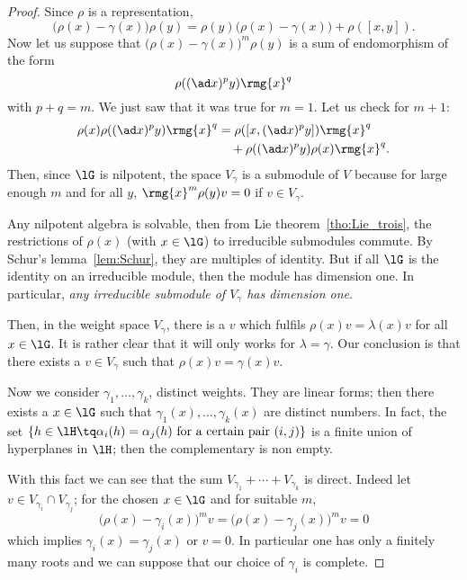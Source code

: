 \begin{proof}
Since $\rho$ is a representation,
\[
\big(\rho(x)-\gamma(x)\big)\rho(y)=\rho(y)\big( \rho(x)-\gamma(x) \big)+\rho([x,y]).
\]
Now let us suppose that $\big(\rho(x)-\gamma(x)\big)^m\rho(y)$ is a sum of endomorphism of the form
\[
\rho( (\ad x)^py )\rmg{x}^q
\]
with $p+q=m$. We just saw that it was true for $m=1$. Let us check for $m+1$:
\begin{equation}
\begin{split}
\rho(x)\rho( (\ad x)^py )\rmg{x}^q&=\rho( [x,(\ad x)^py] )\rmg{x}^q\\
&\quad+\rho((\ad x)^py)\rho(x)\rmg{x}^q.
\end{split}
\end{equation}
Then, since $\lG$ is nilpotent, the space $V_{\gamma}$ is a submodule of $V$ because for large enough $m$ and for all $y$, $\rmg{x}^m \rho(y)v=0$ if $v\in V_{\gamma}$.

Any nilpotent algebra is solvable, then from Lie theorem~\ref{tho:Lie_trois}, the restrictions of $\rho(x)$ (with $x\in\lG$) to irreducible submodules commute. By Schur's lemma~\ref{lem:Schur}, they are multiples of identity. But if all $\lG$ is the identity on an irreducible module, then the module has dimension one. In particular, \emph{any irreducible submodule of $V_{\gamma}$ has dimension one}.

Then, in the weight space $V_{\gamma}$, there is a $v$ which fulfils  $\rho(x)v=\lambda(x)v$ for all $x\in\lG$. It is rather clear that it will only works for $\lambda=\gamma$. Our conclusion is that there exists a $v\in V_{\gamma}$ such that $\rho(x)v=\gamma(x)v$.

Now we consider $\gamma_1,\ldots,\gamma_k$, distinct weights. They are linear forms; then there exists a $x\in\lG$ such that $\gamma_1(x),\ldots,\gamma_k(x)$ are distinct numbers. In fact, the set $\{h\in\lH\tq \alpha_i(h)=\alpha_j(h)\text{ for a certain pair }(i,j)\}$ is a finite union of hyperplanes in $\lH$; then the complementary is non empty.


With this fact we can see that the sum $V_{\gamma_1}+\cdots+V_{\gamma_k}$ is direct. Indeed let $v\in V_{\gamma_i}\cap V_{\gamma_j}$; for the chosen $x\in\lG$ and for suitable $m$,
\begin{equation}
\big(  \rho(x)-\gamma_i(x) \big)^mv=\big(  \rho(x)-\gamma_j(x) \big)^mv=0
\end{equation}
which implies $\gamma_i(x)=\gamma_j(x)$ or $v=0$. In particular one has only a finitely many roots and we can suppose that our choice of $\gamma_i$ is complete.


\end{proof}

